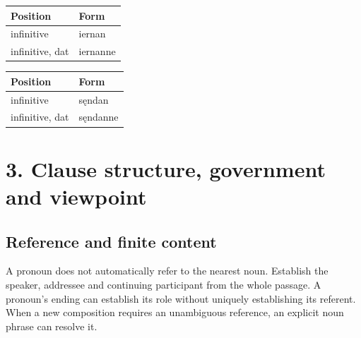 \par\begingroup
\fontsize{10.5}{13.2}\selectfont
\setlength{\LTleft}{0pt}\setlength{\LTright}{\fill}
\noindent
\begin{tabular}{@{}>{\raggedright\arraybackslash}p{68.04mm}>{\raggedright\arraybackslash}p{53.15mm}@{}}
\toprule
\textbf{Position} & \textbf{Form} \\
\midrule
infinitive & iernan \\
infinitive, dat & iernanne \\
\bottomrule
\end{tabular}
\par\endgroup

\par\begingroup
\fontsize{10.5}{13.2}\selectfont
\setlength{\LTleft}{0pt}\setlength{\LTright}{\fill}
\noindent
\begin{tabular}{@{}>{\raggedright\arraybackslash}p{68.04mm}>{\raggedright\arraybackslash}p{53.15mm}@{}}
\toprule
\textbf{Position} & \textbf{Form} \\
\midrule
infinitive & sęndan \\
infinitive, dat & sęndanne \\
\bottomrule
\end{tabular}
\par\endgroup

\section*{3. Clause structure, government and viewpoint}

\subsection*{Reference and finite content}

A pronoun does not automatically refer to the nearest noun. Establish the speaker, addressee and continuing participant from the whole passage. A pronoun’s ending can establish its role without uniquely establishing its referent. When a new composition requires an unambiguous reference, an explicit noun phrase can resolve it.

